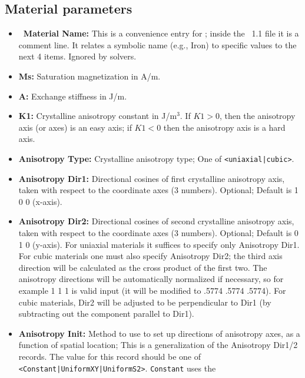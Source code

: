 \subsection{Material parameters}\label{sec:mif1materials}
\begin{itemize}
\item {\bf\lb\ Material Name:} This is a convenience entry for
   ; inside the \MIF~1.1 file it is a comment line.  It
   relates a symbolic name (e.g., Iron) to specific values to the next
   4 items.  Ignored by solvers.
\item {\bf Ms:} Saturation magnetization
   in A/m.
\item {\bf A:} Exchange stiffness in J/m.
\item {\bf K1:} Crystalline
 anisotropy
   constant in J/m${}^3$.  If $K1>0$, then the anisotropy axis (or axes)
   is an easy axis; if $K1<0$ then the anisotropy axis is a hard axis.
\item {\bf Anisotropy Type:} Crystalline anisotropy type; One of
\texttt{<uniaxial|cubic>}.
\item {\bf Anisotropy Dir1:} Directional cosines of first crystalline
   anisotropy axis, taken with respect to the coordinate axes (3
   numbers).  Optional; Default is 1 0 0 (x-axis).
\item {\bf Anisotropy Dir2:} Directional cosines of second crystalline
   anisotropy axis, taken with respect to the coordinate axes (3
   numbers).  Optional; Default is 0 1 0 (y-axis).
   \html{\\}\latex{\par}
   For uniaxial materials it suffices to specify only Anisotropy
   Dir1.  For cubic materials one must also specify Anisotropy
   Dir2; the third axis direction will be calculated as the cross
   product of the first two.  The anisotropy directions will be
   automatically normalized if necessary, so for example 1 1 1 is
   valid input (it will be modified to .5774 .5774 .5774).  For cubic
   materials, Dir2 will be adjusted to be perpendicular to Dir1 (by
   subtracting out the component parallel to Dir1).
\item {\bf Anisotropy Init:}
   Method to use to set up directions of anisotropy axes, as a function
   of spatial location; This is a generalization of the Anisotropy
   Dir1/2 records.  The value for this record should be one of
   \texttt{<Constant|UniformXY|UniformS2>}.  \texttt{Constant} uses the

\end{itemize}
